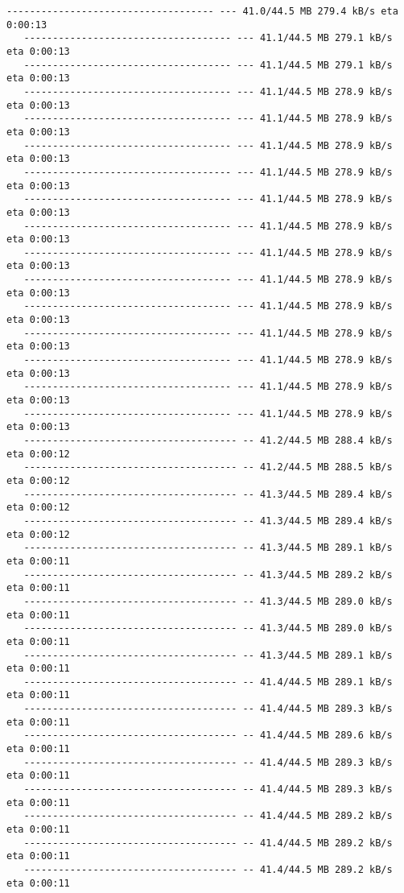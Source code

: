 \documentclass[11pt]{article}
\begin{document}
\begin{Verbatim}[commandchars=\\\{\}]
   ------------------------------------ --- 41.0/44.5 MB 279.4 kB/s eta 0:00:13
   ------------------------------------ --- 41.1/44.5 MB 279.1 kB/s eta 0:00:13
   ------------------------------------ --- 41.1/44.5 MB 279.1 kB/s eta 0:00:13
   ------------------------------------ --- 41.1/44.5 MB 278.9 kB/s eta 0:00:13
   ------------------------------------ --- 41.1/44.5 MB 278.9 kB/s eta 0:00:13
   ------------------------------------ --- 41.1/44.5 MB 278.9 kB/s eta 0:00:13
   ------------------------------------ --- 41.1/44.5 MB 278.9 kB/s eta 0:00:13
   ------------------------------------ --- 41.1/44.5 MB 278.9 kB/s eta 0:00:13
   ------------------------------------ --- 41.1/44.5 MB 278.9 kB/s eta 0:00:13
   ------------------------------------ --- 41.1/44.5 MB 278.9 kB/s eta 0:00:13
   ------------------------------------ --- 41.1/44.5 MB 278.9 kB/s eta 0:00:13
   ------------------------------------ --- 41.1/44.5 MB 278.9 kB/s eta 0:00:13
   ------------------------------------ --- 41.1/44.5 MB 278.9 kB/s eta 0:00:13
   ------------------------------------ --- 41.1/44.5 MB 278.9 kB/s eta 0:00:13
   ------------------------------------ --- 41.1/44.5 MB 278.9 kB/s eta 0:00:13
   ------------------------------------ --- 41.1/44.5 MB 278.9 kB/s eta 0:00:13
   ------------------------------------- -- 41.2/44.5 MB 288.4 kB/s eta 0:00:12
   ------------------------------------- -- 41.2/44.5 MB 288.5 kB/s eta 0:00:12
   ------------------------------------- -- 41.3/44.5 MB 289.4 kB/s eta 0:00:12
   ------------------------------------- -- 41.3/44.5 MB 289.4 kB/s eta 0:00:12
   ------------------------------------- -- 41.3/44.5 MB 289.1 kB/s eta 0:00:11
   ------------------------------------- -- 41.3/44.5 MB 289.2 kB/s eta 0:00:11
   ------------------------------------- -- 41.3/44.5 MB 289.0 kB/s eta 0:00:11
   ------------------------------------- -- 41.3/44.5 MB 289.0 kB/s eta 0:00:11
   ------------------------------------- -- 41.3/44.5 MB 289.1 kB/s eta 0:00:11
   ------------------------------------- -- 41.4/44.5 MB 289.1 kB/s eta 0:00:11
   ------------------------------------- -- 41.4/44.5 MB 289.3 kB/s eta 0:00:11
   ------------------------------------- -- 41.4/44.5 MB 289.6 kB/s eta 0:00:11
   ------------------------------------- -- 41.4/44.5 MB 289.3 kB/s eta 0:00:11
   ------------------------------------- -- 41.4/44.5 MB 289.3 kB/s eta 0:00:11
   ------------------------------------- -- 41.4/44.5 MB 289.2 kB/s eta 0:00:11
   ------------------------------------- -- 41.4/44.5 MB 289.2 kB/s eta 0:00:11
   ------------------------------------- -- 41.4/44.5 MB 289.2 kB/s eta 0:00:11

\end{Verbatim}
\end{document}
